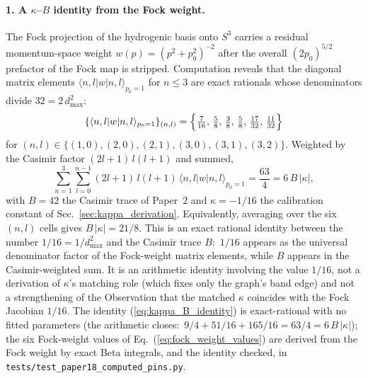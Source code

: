 \documentclass[aps,pra,twocolumn,superscriptaddress,longbibliography]{revtex4-2}
\begin{document}
\paragraph{1. A $\kappa$--$B$ identity from the Fock weight.}
The Fock projection of the hydrogenic basis onto $S^3$ carries a
residual momentum-space weight
$w(p) = (p^2 + p_0^2)^{-2}$
after the overall $(2p_0)^{5/2}$ prefactor of the Fock map is
stripped.  Computation reveals that the diagonal matrix elements
$\langle n,l|w|n,l\rangle_{p_0 = 1}$ for $n \le 3$ are exact
rationals whose denominators divide $32 = 2\,d_{\max}^2$:
\begin{equation}
  \{\langle n,l|w|n,l\rangle_{p_0 = 1}\}_{(n,l)}
  = \Bigl\{ \tfrac{7}{16},\, \tfrac{5}{8},\, \tfrac{3}{8},\,
            \tfrac{5}{8},\, \tfrac{17}{32},\, \tfrac{11}{32} \Bigr\}
  \label{eq:fock_weight_values}
\end{equation}
for $(n,l) \in \{(1,0),(2,0),(2,1),(3,0),(3,1),(3,2)\}$.  Weighted
by the Casimir factor $(2l+1)\,l(l+1)$ and summed,
\begin{equation}
  \sum_{n=1}^{3}\sum_{l=0}^{n-1} (2l+1)\,l(l+1)\,
    \langle n,l|w|n,l\rangle_{p_0 = 1}
  = \frac{63}{4}
  = 6\,B\,|\kappa|,
  \label{eq:kappa_B_identity}
\end{equation}
with $B = 42$ the Casimir trace of Paper~2 and $\kappa = -1/16$
the calibration constant of Sec.~\ref{sec:kappa_derivation}.
Equivalently, averaging over the six $(n,l)$ cells gives
$B\,|\kappa| = 21/8$.  This is an exact rational identity between
the number $1/16 = 1/d_{\max}^2$ and the Casimir trace $B$:\ $1/16$
appears as the universal denominator factor of the Fock-weight matrix
elements, while $B$ appears in the Casimir-weighted sum.  It is an
arithmetic identity involving the value $1/16$, not a derivation of
$\kappa$'s matching role (which fixes only the graph's band edge) and
not a strengthening of the Observation that the matched $\kappa$
coincides with the Fock Jacobian $1/16$.  The identity
(\ref{eq:kappa_B_identity}) is exact-rational with no fitted parameters
(the arithmetic closes:\ $9/4 + 51/16 + 165/16 = 63/4 = 6\,B\,|\kappa|$);
the six Fock-weight values of Eq.~(\ref{eq:fock_weight_values}) are
derived from the Fock weight by exact Beta integrals, and the identity
checked, in \texttt{tests/test\_paper18\_computed\_pins.py}.
\end{document}

